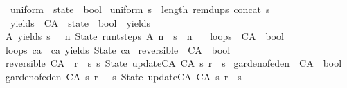 \begin{isabellebody}
\isanewline
{}\isamarkupfalse%
\ uniform\ {\isacharcolon}{\isacharcolon}\ {\isachardoublequoteopen}state\ {\isasymRightarrow}\ bool{\isachardoublequoteclose}\ \isanewline
{\isachardoublequoteopen}uniform\ s\ {\isasymequiv}\ length\ {\isacharparenleft}remdups\ {\isacharparenleft}concat\ s{\isacharparenright}{\isacharparenright}\ {\isacharequal}\ {}{\isachardoublequoteclose}\isanewline
\isanewline
{}\isamarkupfalse%
\ yields\ {\isacharcolon}{\isacharcolon}\ {\isachardoublequoteopen}CA\ {\isasymRightarrow}\ state\ {\isasymRightarrow}\ bool{\isachardoublequoteclose}\ {\isacharparenleft}\ {\isacartoucheopen}yields{\isacartoucheclose}\ \ {}{}{\isacharparenright}\ \isanewline
{\isachardoublequoteopen}A\ yields\ s\ {\isasymequiv}\ {\isacharparenleft}{\isasymexists}\ n{\isachardot}\ State\ {\isacharparenleft}run{\isacharunderscore}t{\isacharunderscore}steps\ A\ n{\isacharparenright}\ {\isacharequal}\ s\ {\isasymand}\ n\ {\isachargreater}\ {}{\isacharparenright}{\isachardoublequoteclose}\isanewline
\isanewline
{}\isamarkupfalse%
\ loops\ {\isacharcolon}{\isacharcolon}\ {\isachardoublequoteopen}CA\ {\isasymRightarrow}\ bool{\isachardoublequoteclose}\ \isanewline
{\isachardoublequoteopen}loops\ ca\ {\isasymequiv}\ ca\ yields\ State\ ca{\isachardoublequoteclose}\isanewline
\isanewline
{}\isamarkupfalse%
\ reversible\ {\isacharcolon}{\isacharcolon}\ {\isachardoublequoteopen}CA\ {\isasymRightarrow}\ bool{\isachardoublequoteclose}\ \isanewline
{\isachardoublequoteopen}reversible\ {\isacharparenleft}CA\ {\isacharunderscore}\ r{\isacharparenright}\ {\isacharequal}\ {\isacharparenleft}{\isasymforall}s{\isachardot}\ {\isacharparenleft}{\isasymexists}{\isacharbang}s{}{\isachardot}\ State\ {\isacharparenleft}update{\isacharunderscore}CA\ {\isacharparenleft}CA\ s{}\ r{\isacharparenright}{\isacharparenright}\ {\isacharequal}\ s{\isacharparenright}{\isacharparenright}{\isachardoublequoteclose}\isanewline
\isanewline
{}\isamarkupfalse%
\ garden{\isacharunderscore}of{\isacharunderscore}eden\ {\isacharcolon}{\isacharcolon}\ {\isachardoublequoteopen}CA\ {\isasymRightarrow}\ bool{\isachardoublequoteclose}\ \isanewline
{\isachardoublequoteopen}garden{\isacharunderscore}of{\isacharunderscore}eden\ {\isacharparenleft}CA\ s\ r{\isacharparenright}\ {\isacharequal}\ {\isacharparenleft}{\isasymnot}{\isacharparenleft}{\isasymexists}\ s{}{\isachardot}\ State\ {\isacharparenleft}update{\isacharunderscore}CA\ {\isacharparenleft}CA\ s{}\ r{\isacharparenright}{\isacharparenright}\ {\isacharequal}\ s{\isacharparenright}{\isacharparenright}{\isachardoublequoteclose}\isanewline

\end{isabellebody}
